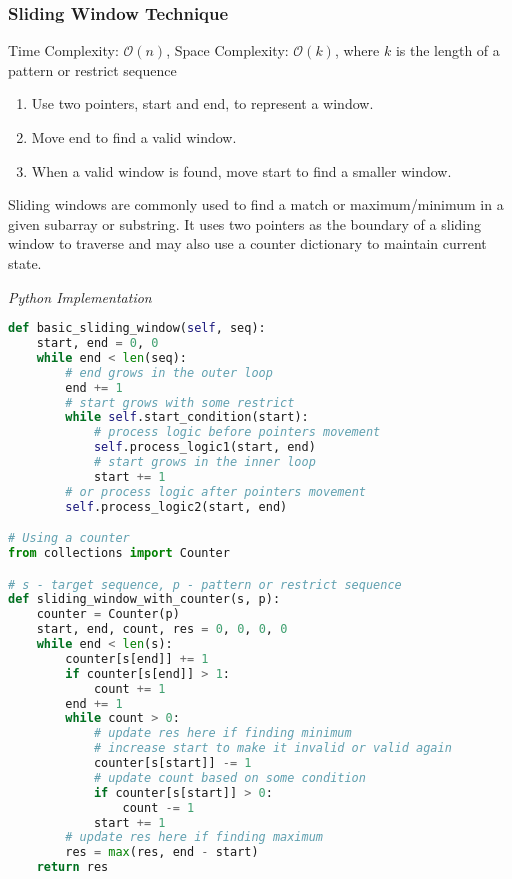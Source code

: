 \documentclass{article}
\newcommand{\bigO}{\mathcal{O}}
\begin{document}
    \subsubsection{Sliding Window Technique}
    Time Complexity: $\bigO(n)$, Space Complexity: $\bigO(k)$, where $k$ is the length of a pattern or restrict sequence 
    
    \begin{enumerate}
        \item Use two pointers, start and end, to represent a window.
        \item Move end to find a valid window.
        \item When a valid window is found, move start to find a smaller window.
    \end{enumerate}
    
    Sliding windows are commonly used to find a match or maximum/minimum in a given subarray or substring. It uses two pointers as the boundary of a sliding window to traverse and may also use a counter dictionary to maintain current state.

\vspace{8pt} \emph{Python Implementation}
\begin{lstlisting}[language=Python]
def basic_sliding_window(self, seq):
    start, end = 0, 0
    while end < len(seq):
        # end grows in the outer loop
        end += 1
        # start grows with some restrict
        while self.start_condition(start):
            # process logic before pointers movement
            self.process_logic1(start, end)
            # start grows in the inner loop
            start += 1
        # or process logic after pointers movement
        self.process_logic2(start, end)

# Using a counter
from collections import Counter

# s - target sequence, p - pattern or restrict sequence
def sliding_window_with_counter(s, p):
    counter = Counter(p)
    start, end, count, res = 0, 0, 0, 0
    while end < len(s):
        counter[s[end]] += 1
        if counter[s[end]] > 1:
            count += 1
        end += 1
        while count > 0:
            # update res here if finding minimum
            # increase start to make it invalid or valid again
            counter[s[start]] -= 1
            # update count based on some condition
            if counter[s[start]] > 0:
                count -= 1
            start += 1
        # update res here if finding maximum
        res = max(res, end - start)
    return res
\end{lstlisting}
\end{document}
